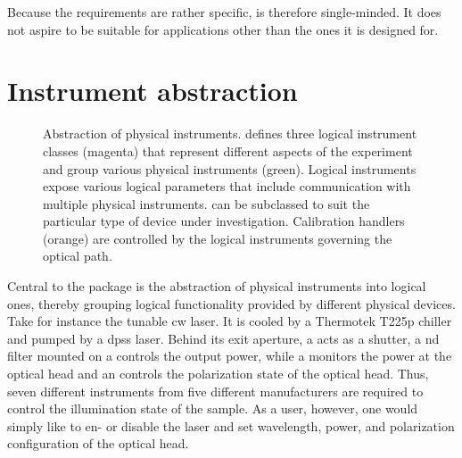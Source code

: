 Because the requirements are rather specific, \mjolnir is therefore single-minded.
It does not aspire to be suitable for applications other than the ones it is designed for.

\section{Instrument abstraction}\label{sec:exp:mjolnir:instruments}
\begin{figure}
    \centering
    
    \caption[]{
        Abstraction of physical instruments.
        \mjolnir defines three logical instrument classes (magenta) that represent different aspects of the experiment and group various physical instruments (green).
        Logical instruments expose various logical parameters that include communication with multiple physical instruments.
         can be subclassed to suit the particular type of device under investigation.
        Calibration handlers (orange) are controlled by the logical instruments governing the optical path.
    }
    \label{fig:exp:mjolnir:layout}
\end{figure}

Central to the \mjolnir package is the abstraction of physical instruments into logical ones, thereby grouping logical functionality provided by different physical devices.
Take for instance the tunable \gls{cw} \tisalaser laser.
It is cooled by a Thermotek T225p chiller and pumped by a \pumplaser \gls{dpss} laser.
Behind its exit aperture, a \thorlabsflipper acts as a shutter, a \gls{nd} filter mounted on a \thorlabsrotator controls the output power, while a \thorlabspowermeter monitors the power at the optical head and an \rotatorcontroller controls the polarization state of the optical head.
Thus, seven different instruments from five different manufacturers are required to control the illumination state of the sample.
As a user, however, one would simply like to en- or disable the laser and set wavelength, power, and polarization configuration of the optical head.

